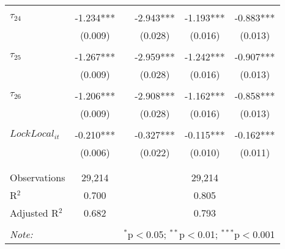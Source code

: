 \begin{tabular}{@{\extracolsep{-5pt}}lccccc}
                &           &&           &           &           \\[-2.1ex]
$\tau_{24}$     & -1.234*** && -2.943*** & -1.193*** & -0.883*** \\
                &  (0.009)  &&  (0.028)  &  (0.016)  &  (0.013)  \\
                &           &&           &           &           \\[-2.1ex]
$\tau_{25}$     & -1.267*** && -2.959*** & -1.242*** & -0.907*** \\
                &  (0.009)  &&  (0.028)  &  (0.016)  &  (0.013)  \\
                &           &&           &           &           \\[-2.1ex]
$\tau_{26}$     & -1.206*** && -2.908*** & -1.162*** & -0.858*** \\
                &  (0.009)  &&  (0.028)  &  (0.016)  &  (0.013)  \\
                &           &&           &           &           \\[-1.ex]
$LockLocal_{it}$ & -0.210*** && -0.327*** & -0.115*** & -0.162*** \\
                &  (0.006)  &&  (0.022)  &  (0.010)  &  (0.011)  \\
                &           &&           &           &           \\[-2.1ex]
\hline \\[-1.8ex] 
Observations     & 29,214 && \multicolumn{3}{c}{29,214} \\ 
R$^{2}$          & 0.700  && \multicolumn{3}{c}{ 0.805} \\ 
Adjusted R$^{2}$ & 0.682  && \multicolumn{3}{c}{ 0.793} \\ 
\hline 
\hline \\[-1.8ex] 
\textit{Note:}  & \multicolumn{5}{r}{$^{*}$p$<$0.05; $^{**}$p$<$0.01; $^{***}$p$<$0.001} \\ 
\end{tabular} 